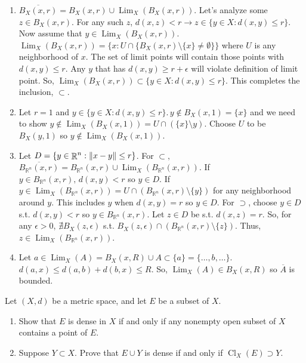 \documentclass[12pt,letterpaper,boxed]{hmcpset}
\DeclareMathOperator{\Lim}{Lim}
\DeclareMathOperator{\Cl}{Cl}
\DeclareMathOperator{\R}{\mathbb{R}}
\DeclarePairedDelimiter{\norm}{\lVert}{\rVert}
\begin{document}
\begin{solution}
\vspace{-2mm}
	\begin{enumerate}
		\itemsep0em
		\item $\overline{B_X(x,r)} = B_X(x, r) \cup \Lim_X(B_X(x, r)).$ Let's analyze some $z \in B_X(x, r)$. For any such $z$, $d(x, z) < r \rightarrow z \in \{y \in X : d(x,y) \leq r\}$. Now assume that $y \in \Lim_X(B_X(x, r)).$ $\Lim_X(B_X(x,r)) = \{x : U \cap \{ B_X(x,r)\setminus\{x\}\neq \emptyset \}\}$ where $U$ is any neighborhood of $x$. The set of limit points will contain those points with $d(x,y) \leq r.$ Any $y$ that has $d(x, y) \ge r + \epsilon$ will violate definition of limit point. So, $\Lim_X(B_X(x,r)) \subset \{y \in X : d(x,y) \leq r\}$. This completes the inclusion, $\subset$.
		\item Let $r = 1$ and $y \in \{y \in X : d(x, y) \leq r\}. \,y \notin B_X(x, 1)=\{x\}$ and we need to show $y \notin \Lim_X(B_X(x, 1)) = U\cap (\{x\}\setminus y).$ Choose $U$ to be $B_X(y,1)$ so $y \notin \Lim_X(B_X(x,1))$.
		\item Let $D = \{y \in \R^{n} : \norm{x - y} \leq r\}$. For $\subset,$ $\overline{B_{\R^{n}}(x,r)} = B_{\R^{n}}(x,r) \cup \Lim_X(B_{\R^{n}}(x,r)).$ If $y \in B_{\R^{n}}(x,r), \, d(x, y) < r$ so $y \in D.$ If $y \in \Lim_X(B_{\R^{n}}(x,r)) = U\cap(B_{\R^{n}}(x,r)\setminus\{y\})$ for any neighborhood around $y$. This includes $y$ when $d(x, y) = r$ so $y \in D.$ For $\supset$, choose $y \in D$ s.t. $d(x,y)<r$ so $y \in B_{\R^{n}}(x,r)$. Let $z \in D$ be s.t. $d(x, z) = r$. So, for any $\epsilon > 0$, $\nexists B_X(z, \epsilon)$ s.t. $B_X(z, \epsilon)\cap(B_{\R^{n}}(x,r)\setminus\{z\}).$ Thus, $z \in \Lim_X(B_{\R^{n}}(x,r))$.
		\item Let $a \in \Lim_X(A) = B_X(x,R)\cup A \subset \{ a\}= \{\dots, b, \dots\}$. $d(a, x) \leq d(a, b) + d(b, x) \leq R.$ So, $\Lim_X(A)\in B_X(x,R)$ so $\overline{A}$ is bounded.
	\end{enumerate}
\end{solution}


\begin{problem}[Exercise 1.30]
Let $(X, d)$ be a metric space, and let $E$ be a subset of $X$. 
	\vspace{-2mm}
	\begin{enumerate}
		\itemsep0em
		\item Show that $E$ is dense in $X$ if and only if any nonempty open subset of $X$ contains a point of $E$.
		\item Suppose $Y\subset X.$ Prove that $E\cup Y$ is dense if and only if $\Cl_X(E) \supset Y$.
	\end{enumerate}
\end{problem}
\end{document}
